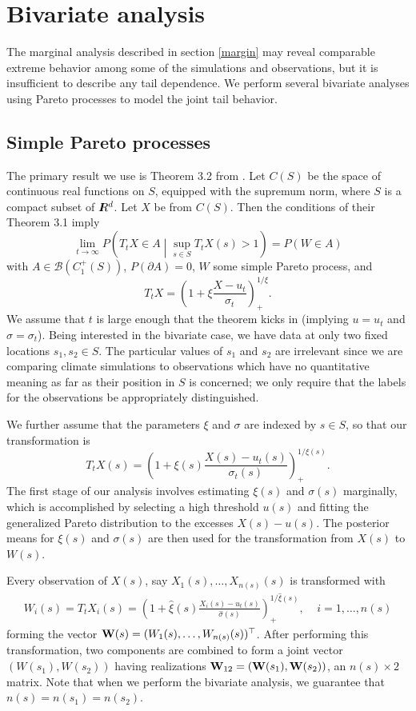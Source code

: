 \section{Bivariate analysis}

The marginal analysis described in section \ref{margin} may reveal comparable extreme behavior among  some of the simulations and observations, but it is insufficient to describe any tail dependence. We perform several bivariate analyses using Pareto processes to model the joint tail behavior.

\subsection{Simple Pareto processes}

The primary result we use is Theorem 3.2 from \cite{ferreira2014generalized}. Let $C(S)$ be the space of continuous real functions on $S$, equipped with the supremum norm, where $S$ is a compact subset of $I\hspace{-4.4pt}R^d$. Let $X$ be from $C(S)$. Then the conditions of their Theorem 3.1 imply
\[ \lim_{t\rightarrow\infty} P\left(T_t X \in A \middle| \sup_{s\in S} T_t X(s) > 1\right) = P(W \in A) \]
with $A \in \mathcal{B}(C_1^+(S))$, $P(\partial A)=0$, $W$ some simple Pareto process, and
\[ T_t X = \left(1 + \xi \frac{X - u_t}{\sigma_t}\right)_+^{1/\xi}. \]
We assume that $t$ is large enough that the theorem kicks in (implying $u=u_t$ and $\sigma=\sigma_t$). Being interested in the bivariate case, we have data at only two fixed locations $s_1,s_2\in S$. The particular values of $s_1$ and $s_2$ are irrelevant since we are comparing climate simulations to observations which have no quantitative meaning as far as their position in $S$ is concerned; we only require that the labels for the observations be appropriately distinguished.

We further assume that the parameters $\xi$ and $\sigma$ are indexed by $s\in S$, so that our transformation is
\[ T_t X(s) = \left(1 + \xi(s) \frac{X(s) - u_t(s)}{\sigma_t(s)}\right)_+^{1/\xi(s)}. \]
The first stage of our analysis involves estimating $\xi(s)$ and $\sigma(s)$ marginally, which is accomplished by selecting a high threshold $u(s)$ and fitting the generalized Pareto distribution to the excesses $X(s)-u(s)$. The posterior means for $\xi(s)$ and $\sigma(s)$ are then used for the transformation from $X(s)$ to $W(s)$.

Every observation of $X(s)$, say $X_1(s),\ldots,X_{n(s)}(s)$ is transformed with
\begin{align}
W_i(s) = T_t X_i(s) = \left(1 + \hat{\xi}(s) \frac{X_i(s) - u_t(s)}{\hat{\sigma}(s)}\right)_+^{1/\hat{\xi}(s)},~~~~~i=1,\ldots,n(s) \label{transform}
\end{align}
forming the vector $\mathbf{\bm{W}}(s)=(W_1(s),\ldots,W_{n(s)}(s))^\top$. After performing this transformation, two components are combined to form a joint vector $(W(s_1), W(s_2))$ having realizations $\mathbf{\bm{W}}_{12}=(\mathbf{\bm{W}}(s_1), \mathbf{\bm{W}}(s_2))$, an $n(s)\times 2$ matrix. Note that when we perform the bivariate analysis, we guarantee that $n(s)=n(s_1)=n(s_2)$.

